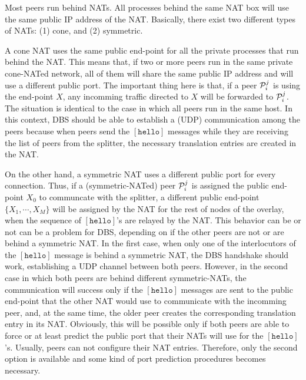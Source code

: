 
Most peers run behind NATs. All processes behind the same NAT box will
use the same public IP address of the NAT. Basically, there exist two
different types of NATs: (1) cone, and (2) symmetric.

A cone NAT uses the same public end-point for all the private
processes that run behind the NAT. This means that, if two or more
peers run in the same private cone-NATed network, all of them will
share the same public IP address and will use a different public
port. The important thing here is that, if a peer ${\cal P}^j_i$ is
using the end-point $X$, any incomming traffic directed to $X$ will be
forwarded to ${\cal P}^j_i$. The situation is identical to the case in
which all peers run in the same host. In this context, DBS should be
able to establish a (UDP) communication among the peers because when
peers send the $[\mathtt{hello}]$ messages while they are receiving
the list of peers from the splitter, the necessary translation entries
are created in the NAT.

On the other hand, a symmetric NAT uses a different public port for
every connection. Thus, if a (symmetric-NATed) peer ${\cal P}^j_i$ is
assigned the public end-point $X_0$ to communcate with the splitter, a
different public end-point $\{X_1, \cdots, X_M\}$ will be assigned by
the NAT for the rest of nodes of the overlay, when the sequence of
$[\mathtt{hello}]$'s are relayed by the NAT. This behavior can be or
not can be a problem for DBS, depending on if the other peers are not
or are behind a symmetric NAT. In the first case, when only one of the
interlocutors of the $[\mathtt{hello}]$ message is behind a symmetric
NAT, the DBS handshake should work, establishing a UDP channel between
both peers. However, in the second case in which both peers are behind
different symmetric-NATs, the communication will success only if the
$[\mathtt{hello}]$ messages are sent to the public end-point that the
other NAT would use to communicate with the incomming peer, and, at
the same time, the older peer creates the corresponding translation
entry in its NAT. Obviously, this will be possible only if both peers
are able to force or at least predict the public port that their NATs
will use for the $[\mathtt{hello}]$'s. Usually, peers can not
configure their NAT entries. Therefore, only the second option is
available and some kind of port prediction procedures becomes
necessary.
